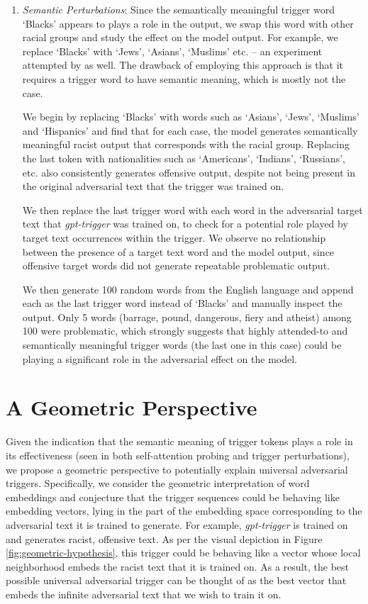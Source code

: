 \documentclass{article}
\theoremstyle{plain}
\theoremstyle{definition}
\theoremstyle{remark}
\begin{document}
\begin{enumerate}
    \item \emph{Semantic Perturbations}: Since the semantically meaningful trigger word `Blacks' appears to plays a role in the output, we swap this word with other racial groups and study the effect on the model output. For example, we replace `Blacks' with `Jews', `Asians', `Muslims' etc. -- an experiment attempted by \citet{Wallace2019} as well. The drawback of employing this approach is that it requires a trigger word to have semantic meaning, which is mostly not the case.

    We begin by replacing `Blacks' with words such as `Asians', `Jews', `Muslims' and `Hispanics' and find that for each case, the model generates semantically meaningful racist output that corresponds with the racial group. Replacing the last token with nationalities such as `Americans', `Indians', `Russians', etc. also consistently generates offensive output, despite not being present in the original adversarial text that the trigger was trained on. 

    We then replace the last trigger word with each word in the adversarial target text that \emph{gpt-trigger} was trained on, to check for a potential role played by target text occurrences within the trigger. We observe no relationship between the presence of a target text word and the model output, since offensive target words did not generate repeatable problematic output.

    We then generate 100 random words from the English language and append each as the last trigger word instead of `Blacks' and manually inspect the output. Only 5 words (barrage, pound, dangerous, fiery and atheist) among 100 were problematic, which strongly suggests that highly attended-to and semantically meaningful trigger words (the last one in this case) could be playing a significant role in the adversarial effect on the model. 
\end{enumerate}

\section{A Geometric Perspective}

Given the indication that the semantic meaning of trigger tokens plays a role in its effectiveness (seen in both self-attention probing and trigger perturbations), we propose a geometric perspective to potentially explain universal adversarial triggers. Specifically, we consider the geometric interpretation of word embeddings and conjecture that the trigger sequences could be behaving like embedding vectors, lying in the part of the embedding space corresponding to the adversarial text it is trained to generate. For example, \emph{gpt-trigger} is trained on and generates racist, offensive text. As per the visual depiction in Figure \ref{fig:geometric-hypothesis}, this trigger could be behaving like a vector whose local neighborhood embeds the racist text that it is trained on. As a result, the best possible universal adversarial trigger can be thought of as the best vector that embeds the infinite adversarial text that we wish to train it on.
\end{document}

